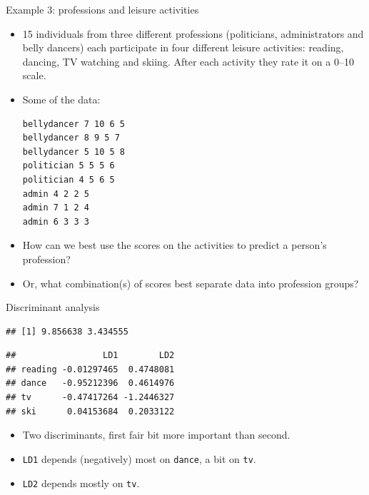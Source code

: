 \begin{frame}[fragile]{Example 3: professions and leisure activities}

  \begin{itemize}
  \item 15 individuals from three different professions (politicians,
    administrators and belly dancers) each participate in four
    different leisure activities: reading, dancing, TV watching and
    skiing. After each activity they rate it on a 0--10 scale.
  \item Some of the data:

\begin{verbatim}
bellydancer 7 10 6 5
bellydancer 8 9 5 7
bellydancer 5 10 5 8
politician 5 5 5 6
politician 4 5 6 5
admin 4 2 2 5
admin 7 1 2 4
admin 6 3 3 3
\end{verbatim}
  \item How can we best use the scores on the activities to predict a person's profession?
  \item Or, what combination(s) of scores best separate data into profession groups?
  \end{itemize}

\end{frame}

\begin{frame}[fragile]{Discriminant analysis}

\begin{knitrout}
\color{fgcolor}\begin{kframe}
\begin{alltt}
\hlkwb{=}\hlstd{(}\hlstd{,}
\hlkwb{=}\hlopt{~}\hlopt{+}\hlopt{+}\hlopt{+}
\hlopt{$}
\end{alltt}
\begin{verbatim}
## [1] 9.856638 3.434555
\end{verbatim}
\begin{alltt}
\hlopt{$}
\end{alltt}
\begin{verbatim}
##                 LD1        LD2
## reading -0.01297465  0.4748081
## dance   -0.95212396  0.4614976
## tv      -0.47417264 -1.2446327
## ski      0.04153684  0.2033122
\end{verbatim}
\end{kframe}
\end{knitrout}

\begin{itemize}
\item Two discriminants, first fair bit more important than second.
\item \texttt{LD1} depends (negatively) most on \texttt{dance}, a bit
  on \texttt{tv}.
\item \texttt{LD2} depends mostly on \texttt{tv}.
\end{itemize}

\end{frame}



